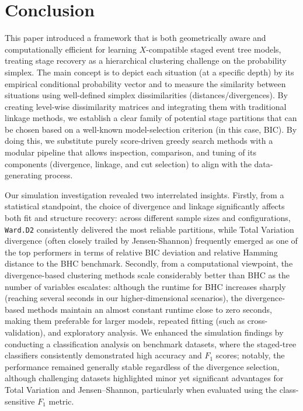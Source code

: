 \documentclass[preprint,12pt]{elsarticle}
\begin{document}
\section{Conclusion}
\label{con}

This paper introduced a framework that is both geometrically aware and computationally efficient for learning $X$-compatible staged event tree models, treating stage recovery as a hierarchical clustering challenge on the probability simplex. The main concept is to depict each situation (at a specific depth) by its empirical conditional probability vector and to measure the similarity between situations using well-defined simplex dissimilarities (distances/divergences). By creating level-wise dissimilarity matrices and integrating them with traditional linkage methods, we establish a clear family of potential stage partitions that can be chosen based on a well-known model-selection criterion (in this case, BIC). By doing this, we substitute purely score-driven greedy search methods with a modular pipeline that allows inspection, comparison, and tuning of its components (divergence, linkage, and cut selection) to align with the data-generating process.

Our simulation investigation revealed two interrelated insights. Firstly, from a statistical standpoint, the choice of divergence and linkage significantly affects both fit and structure recovery: across different sample sizes and configurations, \texttt{Ward.D2} consistently delivered the most reliable partitions, while Total Variation divergence (often closely trailed by Jensen-Shannon) frequently emerged as one of the top performers in terms of relative BIC deviation and relative Hamming distance to the BHC benchmark. Secondly, from a computational viewpoint, the divergence-based clustering methods scale considerably better than BHC as the number of variables escalates: although the runtime for BHC increases sharply (reaching several seconds in our higher-dimensional scenarios), the divergence-based methods maintain an almost constant runtime close to zero seconds, making them preferable for larger models, repeated fitting (such as cross-validation), and exploratory analysis. We enhanced the simulation findings by conducting a classification analysis on benchmark datasets, where the staged-tree classifiers consistently demonstrated high accuracy and $F_1$ scores; notably, the performance remained generally stable regardless of the divergence selection, although challenging datasets highlighted minor yet significant advantages for Total Variation and Jensen--Shannon, particularly when evaluated using the class-sensitive $F_1$ metric.
\end{document}
